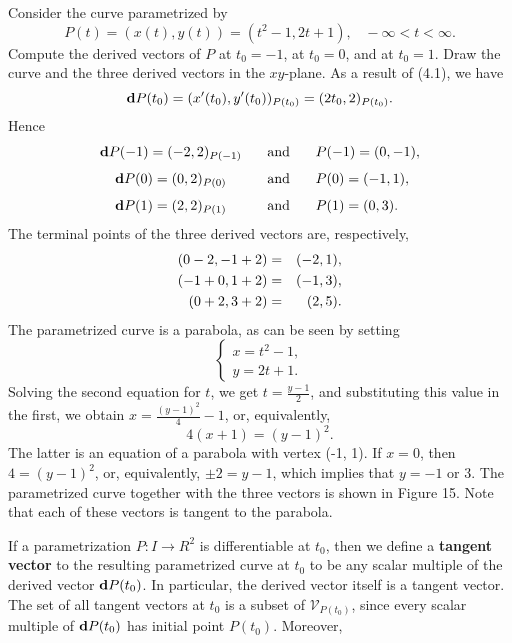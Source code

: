 \begin{example} Consider the curve parametrized by
$$
P(t) = (x(t), y(t)) = (t^2 - 1, 2t + 1), \;\;\; - \infty < t < \infty.
$$
Compute the derived vectors of $P$ at $t_0 = - 1$, at $t_0 = 0$, and at $t_0 = 1$. Draw the curve and the three derived vectors in the $xy$-plane. As a result of (4.1), we have
$$
\mbox{\bf{d}}P(t_0) = (x'(t_0),y'(t_0))_{P(t_0)} = (2t_0, 2)_{P(t_0)} .
$$
Hence 
$$
\begin{array}{ccl}
\mbox{\bf{d}}P(-1) = (- 2, 2)_{P(-1)}&\;\;\;\mathrm{and}&\;\;\; P(-1) = (0, -1), \vspace{.1in}\\
\mbox{\bf{d}}P(0) = (0, 2)_{P(0)}     &\;\;\;\mathrm{and}&\;\;\; P(0) = (-1, 1), \vspace{.1in}\\
\mbox{\bf{d}}P(1) = (2, 2)_{P(1)}     &\;\;\;\mathrm{and}&\;\;\; P(1) = (0, 3) .
\end{array}
$$
The terminal points of the three derived vectors are, respectively,
\begin{eqnarray*}
(0 - 2, -1 + 2) &=& (-2, 1), \vspace{.1in}\\
(-1 + 0, 1 + 2) &=& (-1, 3), \vspace{.1in}\\
(0 + 2, 3 + 2) &=& (2, 5) . 
\end{eqnarray*}
The parametrized curve is a parabola, as can be seen by setting
$$
\left \{ \begin{array}{l}
x = t^2 - 1, \\
y = 2t + 1.
\end{array}
\right .
$$
Solving the second equation for $t$, we get $t = \frac{y -1}{2}$, and substituting this value in the first, we obtain $x = \frac{(y - 1)^2}{4} - 1$, or, equivalently,
$$
4(x + 1) = (y - 1)^2.
$$
The latter is an equation of a parabola with vertex (-1, 1). If $x = 0$, then $4 = (y -  1)^2$, or, equivalently, $\pm 2 = y -1$, which implies that $y = -1$ or 3. The parametrized curve together with the three vectors is shown in Figure 15. Note that each of these vectors is tangent to the parabola.
\end{example}

If a parametrization $P: I \rightarrow R^2$ is differentiable at $t_0$, then we define a \textbf{tangent vector} to the resulting parametrized curve at $t_0$ to be any scalar multiple of the derived vector $\mbox{\bf{d}}P(t_0)$. In particular, the derived vector itself is a tangent vector. The set of all tangent vectors at $t_0$ is a subset of $\mathcal{V}_{P(t_0)}$, since every scalar multiple of $\mbox{\bf{d}}P(t_0)$ has initial point $P(t_0)$. Moreover,

